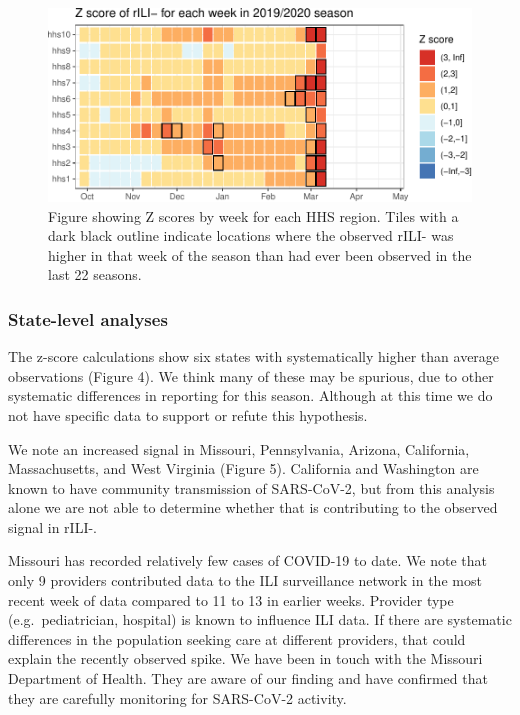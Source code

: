 \documentclass[]{article}
\begin{document}
\begin{figure}
\centering
\includegraphics{ili-labtest-report_files/figure-latex/std-dev-analysis-1.pdf}
\caption{Figure showing Z scores by week for each HHS region. Tiles with
a dark black outline indicate locations where the observed rILI- was
higher in that week of the season than had ever been observed in the
last 22 seasons.}
\end{figure}

\hypertarget{state-level-analyses}{%
\subsubsection{State-level analyses}\label{state-level-analyses}}

The z-score calculations show six states with systematically higher than
average observations (Figure 4). We think many of these may be spurious,
due to other systematic differences in reporting for this season.
Although at this time we do not have specific data to support or refute
this hypothesis.

We note an increased signal in Missouri, Pennsylvania, Arizona,
California, Massachusetts, and West Virginia (Figure 5). California and
Washington are known to have community transmission of SARS-CoV-2, but
from this analysis alone we are not able to determine whether that is
contributing to the observed signal in rILI-.

Missouri has recorded relatively few cases of COVID-19 to date. We note
that only 9 providers contributed data to the ILI surveillance network
in the most recent week of data compared to 11 to 13 in earlier weeks.
Provider type (e.g.~pediatrician, hospital) is known to influence ILI
data. If there are systematic differences in the population seeking care
at different providers, that could explain the recently observed spike.
We have been in touch with the Missouri Department of Health. They are
aware of our finding and have confirmed that they are carefully
monitoring for SARS-CoV-2 activity.
\end{document}
